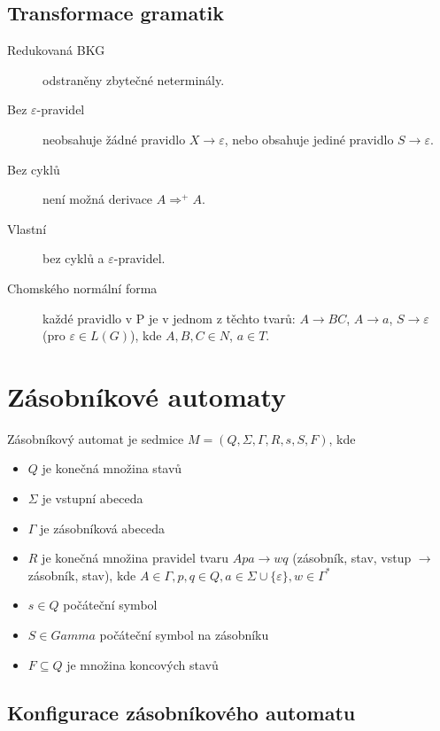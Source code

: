\documentclass[a4paper, 11pt]{report}
\begin{document}
\subsection{Transformace gramatik}

\begin{description}
	\item[Redukovaná BKG] odstraněny zbytečné neterminály.

	\item[Bez $\varepsilon$-pravidel] neobsahuje žádné pravidlo $X \to \varepsilon$, nebo obsahuje jediné pravidlo $S \to \varepsilon$.

	\item[Bez cyklů] není možná derivace $ A \Rightarrow^+ A $.

	\item[Vlastní] bez cyklů a $\varepsilon$-pravidel.

	\item[Chomského normální forma] každé pravidlo v P je v jednom z těchto tvarů: $A \to BC$, $A \to a$, $S \to \varepsilon$ (pro $\varepsilon \in L(G)$), kde $A,B,C \in N$, $a \in T$.
\end{description}

\section{Zásobníkové automaty}

Zásobníkový automat je sedmice $M = (Q, \Sigma, \Gamma, R, s, S, F)$, kde
\begin{itemize}
	\item $Q$ je konečná množina stavů
	\item $\Sigma$ je vstupní abeceda
	\item $\Gamma$ je zásobníková abeceda
	\item $R$ je konečná množina pravidel tvaru $Apa \to wq$ (zásobník, stav, vstup $\to$ zásobník, stav), kde $A \in \Gamma, p,q \in Q, a \in \Sigma \cup \{ \varepsilon \}, w \in \Gamma^*$
	\item $s \in Q$ počáteční symbol
	\item $S \in Gamma$ počáteční symbol na zásobníku
	\item $F \subseteq Q$ je množina koncových stavů
\end{itemize}

\subsection{Konfigurace zásobníkového automatu}
\end{document}
